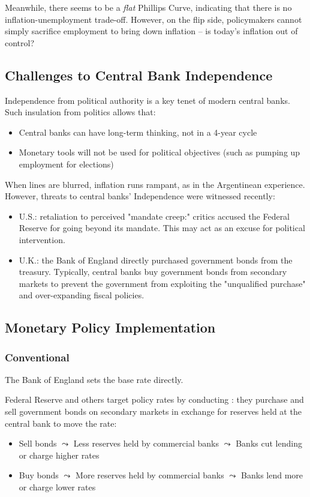             Meanwhile, there seems to be a \emph{flat} Phillips Curve, indicating that there is no inflation-unemployment trade-off. However, on the flip side, policymakers cannot simply sacrifice employment to bring down inflation -- is today's inflation out of control?

    \subsection{Challenges to Central Bank Independence}

        Independence from political authority is a key tenet of modern central banks. Such insulation from politics allows that:
        \begin{itemize}
            \item Central banks can have long-term thinking, not in a 4-year cycle
            \item Monetary tools will not be used for political objectives (such as pumping up employment for elections)
        \end{itemize}

        When lines are blurred, inflation runs rampant, as in the Argentinean experience. However, threats to central banks' Independence were witnessed recently:
        \begin{itemize}
            \item U.S.: retaliation to perceived "mandate creep:" critics accused the Federal Reserve for going beyond its mandate. This may act as an excuse for political intervention.
            \item U.K.: the Bank of England directly purchased government bonds from the treasury. Typically, central banks buy government bonds from secondary markets to prevent the government from exploiting the "unqualified purchase" and over-expanding fiscal policies.
        \end{itemize}
        
    \subsection{Monetary Policy Implementation}

        \subsubsection{Conventional}
            The Bank of England sets the base rate directly.

            Federal Reserve and others target policy rates by conducting : they purchase and sell government bonds on secondary markets in exchange for reserves held at the central bank to move the rate:
            \begin{itemize}
                \item Sell bonds $\leadsto$ Less reserves held by commercial banks $\leadsto$ Banks cut lending or charge higher rates
                \item Buy bonds $\leadsto$ More reserves held by commercial banks $\leadsto$ Banks lend more or charge lower rates
            \end{itemize}
            
